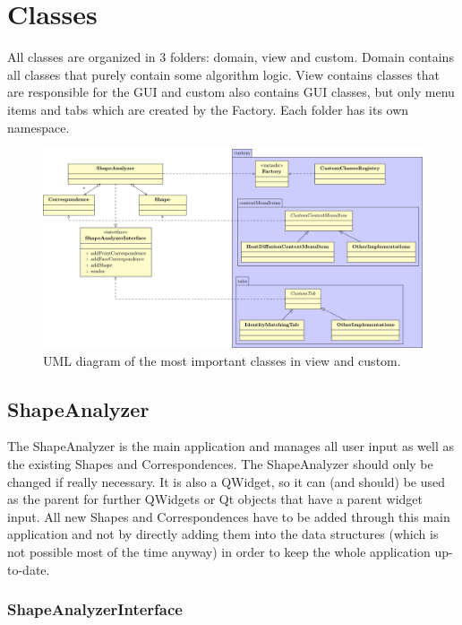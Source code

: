 
\chapter{Classes}

All classes are organized in 3 folders: domain, view and custom. Domain contains all classes that purely contain some algorithm logic. View contains classes that are responsible for the GUI and custom also contains GUI classes, but only menu items and tabs which are created by the Factory. Each folder has its own namespace.

\begin{figure}[h]
	\centering
	\includegraphics[width=\textwidth]{images/diagram.pdf}
	\caption{UML diagram of the most important classes in view and custom.}
\end{figure}

\section{ShapeAnalyzer}
\label{sec:ShapeAnalyzer}

The ShapeAnalyzer is the main application and manages all user input as well as the existing Shapes and Correspondences. The ShapeAnalyzer should only be changed if really necessary. It is also a QWidget, so it can (and should) be used as the parent for further QWidgets or Qt objects that have a parent widget input. All new Shapes and Correspondences have to be added through this main application and not by directly adding them into the data structures (which is not possible most of the time anyway) in order to keep the whole application up-to-date.

\subsection{ShapeAnalyzerInterface}
\label{subsec:ShapeAnalyzerInterface}


